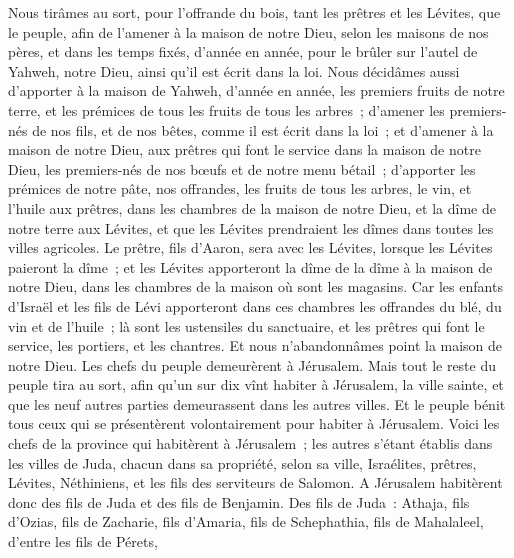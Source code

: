 \begin{multicols}{2}
Nous tirâmes au sort, pour l'offrande du bois, tant les prêtres et les Lévites, que le peuple, afin de l'amener à la maison de notre Dieu, selon les maisons de nos pères, et dans les temps fixés, d'année en année, pour le brûler sur l'autel de Yahweh, notre Dieu, ainsi qu'il est écrit dans la loi.
Nous décidâmes aussi d'apporter à la maison de Yahweh, d'année en année, les premiers fruits de notre terre, et les prémices de tous les fruits de tous les arbres~;
d'amener les premiers-nés de nos fils, et de nos bêtes, comme il est écrit dans la loi~; et d'amener à la maison de notre Dieu, aux prêtres qui font le service dans la maison de notre Dieu, les premiers-nés de nos bœufs et de notre menu bétail~;
d'apporter les prémices de notre pâte, nos offrandes, les fruits de tous les arbres, le vin, et l'huile aux prêtres, dans les chambres de la maison de notre Dieu, et la dîme de notre terre aux Lévites, et que les Lévites prendraient les dîmes dans toutes les villes agricoles.
Le prêtre, fils d'Aaron, sera avec les Lévites, lorsque les Lévites paieront la dîme~; et les Lévites apporteront la dîme de la dîme à la maison de notre Dieu, dans les chambres de la maison où sont les magasins.
Car les enfants d'Israël et les fils de Lévi apporteront dans ces chambres les offrandes du blé, du vin et de l'huile~; là sont les ustensiles du sanctuaire, et les prêtres qui font le service, les portiers, et les chantres. Et nous n'abandonnâmes point la maison de notre Dieu.
\VerseOne{}Les chefs du peuple demeurèrent à Jérusalem. Mais tout le reste du peuple tira au sort, afin qu'un sur dix vînt habiter à Jérusalem, la ville sainte, et que les neuf autres parties demeurassent dans les autres villes.
Et le peuple bénit tous ceux qui se présentèrent volontairement pour habiter à Jérusalem.
Voici les chefs de la province qui habitèrent à Jérusalem~; les autres s'étant établis dans les villes de Juda, chacun dans sa propriété, selon sa ville, Israélites, prêtres, Lévites, Néthiniens, et les fils des serviteurs de Salomon.
A Jérusalem habitèrent donc des fils de Juda et des fils de Benjamin. Des fils de Juda~: Athaja, fils d'Ozias, fils de Zacharie, fils d'Amaria, fils de Schephathia, fils de Mahalaleel, d'entre les fils de Pérets,

\end{multicols}
